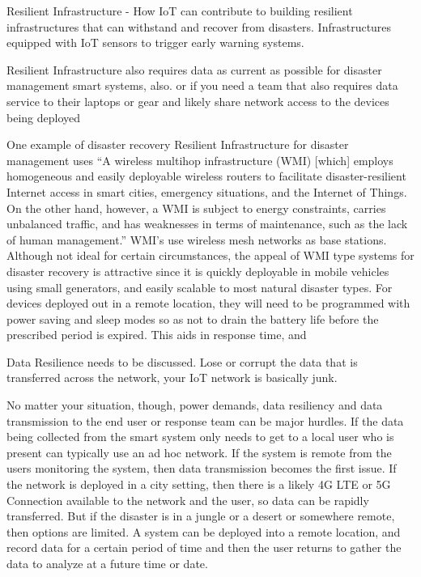\documentclass[conference]{IEEEtran}
\begin{document}
Resilient Infrastructure - How IoT can contribute to building resilient infrastructures that can withstand 
and recover from disasters. Infrastructures equipped with IoT sensors to trigger early warning systems. \par

Resilient Infrastructure also requires data as current as possible for disaster management smart systems, 
also.  or if you need a team that also requires data 
service to their laptops or gear and likely share network access to the devices being deployed \par 

One example of disaster recovery Resilient Infrastructure for disaster management uses 
``A wireless multihop infrastructure (WMI) [which] employs homogeneous and easily deployable
wireless routers to facilitate disaster-resilient Internet access in smart cities, emergency situations, 
and the Internet of Things. On the other hand, however, a WMI is subject to energy constraints, carries
unbalanced traffic, and has weaknesses in terms of maintenance, such as the lack of 
human management.'' \cite{jm2} WMI's use wireless mesh networks as base stations. Although not 
ideal for certain circumstances, the appeal of WMI type systems for disaster recovery is 
attractive since it is quickly deployable in mobile vehicles using small generators, and 
easily scalable to most natural disaster types. For devices deployed out in a remote location, 
they will need to be programmed with power saving and sleep modes so as not to drain the battery 
life before the prescribed period is expired. This aids in response time, and \par

Data Resilience \cite{jm1} needs to be discussed. Lose or corrupt the data that is transferred across the 
network, your IoT network is basically junk.\par

No matter your situation, though, power demands, data resiliency and data transmission to the end user 
or response team can be major hurdles. If the data being collected from the smart system only needs 
to get to a local user who is present can typically use an ad hoc network. If the system is remote 
from the users monitoring the system, then data transmission becomes the first issue. If the network 
is deployed in a city setting, then there is a likely 4G LTE or 5G Connection available to the 
network and the user, so data can be rapidly transferred. But if the disaster is in a jungle 
or a desert or somewhere remote, then options are limited. A system can be deployed into a remote 
location, and record data for a certain period of time and then the user returns to gather the data 
to analyze at a future time or date.\par
\end{document}
